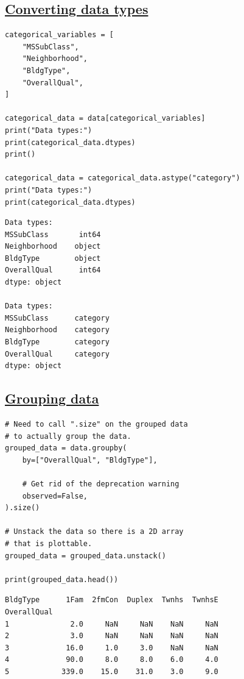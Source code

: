 \documentclass[11pt]{article}
\begin{document}
 \newpage
\subsection{\href{https://pandas.pydata.org/docs/reference/api/pandas.DataFrame.astype.html}{Converting data types}}
\label{sec:org91a18e6}
\begin{verbatim}
categorical_variables = [
    "MSSubClass",
    "Neighborhood",
    "BldgType",
    "OverallQual",
]

categorical_data = data[categorical_variables]
print("Data types:")
print(categorical_data.dtypes)
print()

categorical_data = categorical_data.astype("category")
print("Data types:")
print(categorical_data.dtypes)
\end{verbatim}

\label{org5684155}
\begin{verbatim}
Data types:
MSSubClass       int64
Neighborhood    object
BldgType        object
OverallQual      int64
dtype: object

Data types:
MSSubClass      category
Neighborhood    category
BldgType        category
OverallQual     category
dtype: object
\end{verbatim}

 \newpage
\subsection{\href{https://pandas.pydata.org/docs/reference/api/pandas.DataFrame.groupby.html}{Grouping data}}
\label{sec:org53edd45}
\begin{verbatim}
# Need to call ".size" on the grouped data
# to actually group the data.
grouped_data = data.groupby(
    by=["OverallQual", "BldgType"],

    # Get rid of the deprecation warning
    observed=False,
).size()

# Unstack the data so there is a 2D array
# that is plottable.
grouped_data = grouped_data.unstack()

print(grouped_data.head())
\end{verbatim}

\label{orge1b989d}
\begin{verbatim}
BldgType      1Fam  2fmCon  Duplex  Twnhs  TwnhsE
OverallQual                                      
1              2.0     NaN     NaN    NaN     NaN
2              3.0     NaN     NaN    NaN     NaN
3             16.0     1.0     3.0    NaN     NaN
4             90.0     8.0     8.0    6.0     4.0
5            339.0    15.0    31.0    3.0     9.0
\end{verbatim}
\end{document}
